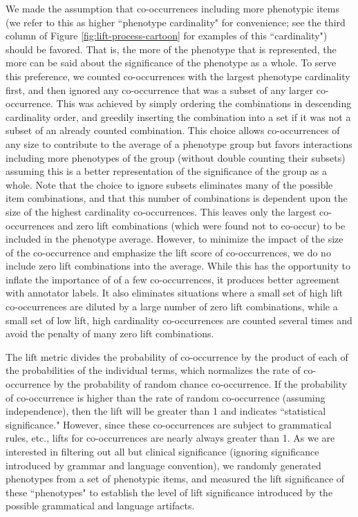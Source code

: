 \documentclass{sig-alternate-05-2015}
\begin{document}
We made the assumption that co-occurrences including more phenotypic items (we refer to this as higher ``phenotype cardinality" for convenience; see the third column of Figure \ref{fig:lift-process-cartoon} for examples of this ``cardinality") should be favored. That is, the more of the phenotype that is represented, the more can be said about the significance of the phenotype as a whole. 
To serve this preference, we counted co-occurrences with the largest phenotype cardinality first, and then ignored any co-occurrence that was a subset of any larger co-occurrence. This was achieved by simply ordering the combinations in descending cardinality order, and greedily inserting the combination into a set if it was not a subset of an already counted combination. 
This choice allows co-occurrences of any size to contribute to the average of a phenotype group but favors interactions including more phenotypes of the group (without double counting their subsets) assuming this is a better representation of the significance of the group as a whole. Note that the choice to ignore subsets eliminates many of the possible item combinations, and that this number of combinations is dependent upon the size of the highest cardinality co-occurrences. This leaves only the largest co-occurrences and zero lift combinations (which were found not to co-occur) to be included in the phenotype average. However, to minimize the impact of the size of the co-occurrence and emphasize the lift score of co-occurrences, we do no include zero lift combinations into the average. While this has the opportunity to inflate the importance of of a few co-occurrences, it produces better agreement with annotator labels. It also eliminates situations where a small set of high lift co-occurrences are diluted by a large number of zero lift combinations, while a small set of low lift, high cardinality co-occurrences are counted several times and avoid the penalty of many zero lift combinations.

The lift metric divides the probability of co-occurrence by the product of each of the probabilities of the individual terms, which normalizes the rate of co-occurrence by the probability of random chance co-occurrence.
If the probability of co-occurrence is higher than the rate of random co-occurrence (assuming independence), then the lift will be greater than 1 and indicates ``statistical significance."
However, since these co-occurrences are subject to grammatical rules, etc., lifts for co-occurrences are nearly always greater than 1.
As we are interested in filtering out all but clinical significance (ignoring significance introduced by grammar and language convention), we randomly generated phenotypes from a set of phenotypic items, and measured the lift significance of these ``phenotypes" to establish the level of lift significance introduced by the possible grammatical and language artifacts.
\end{document}
